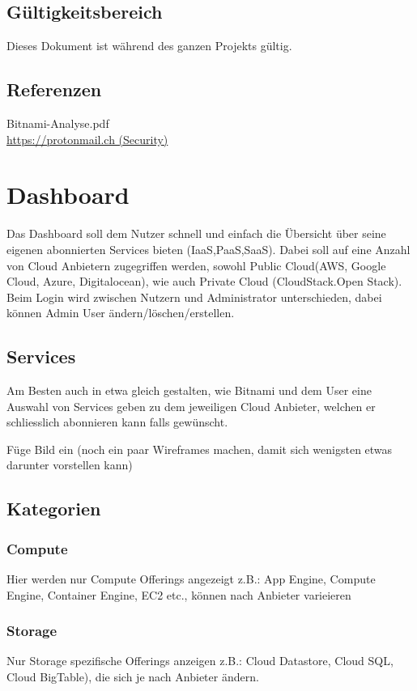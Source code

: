 \documentclass[11pt]{scrartcl}
\begin{document}
\subsection{Gültigkeitsbereich}
Dieses Dokument ist während des ganzen Projekts gültig.

\subsection{Referenzen}
Bitnami-Analyse.pdf\\
\href{https://protonmail.ch}{https://protonmail.ch (Security)} 

\section{Dashboard}
Das Dashboard soll dem Nutzer schnell und einfach die Übersicht über seine 
eigenen abonnierten Services bieten (IaaS,PaaS,SaaS).
Dabei soll auf eine Anzahl von Cloud Anbietern zugegriffen werden, sowohl Public 
Cloud(AWS, Google Cloud, Azure, Digitalocean), wie auch Private Cloud (CloudStack.Open 
Stack).
Beim Login wird zwischen Nutzern und Administrator unterschieden, dabei können 
Admin User ändern/löschen/erstellen.



\subsection{Services}
Am Besten auch in etwa gleich gestalten, wie Bitnami und dem User eine Auswahl 
von Services geben zu dem jeweiligen Cloud Anbieter, welchen er schliesslich 
abonnieren kann falls gewünscht.

Füge Bild ein (noch ein paar Wireframes machen, damit sich wenigsten etwas darunter vorstellen kann)

\subsection{Kategorien}
\subsubsection{Compute}
Hier werden nur Compute Offerings angezeigt z.B.: App Engine, Compute Engine, 
Container Engine, EC2 etc., können nach Anbieter varieieren


\subsubsection{Storage}
Nur Storage spezifische Offerings anzeigen z.B.: Cloud Datastore, Cloud SQL, 
Cloud BigTable), die sich je nach Anbieter ändern.
\end{document}
